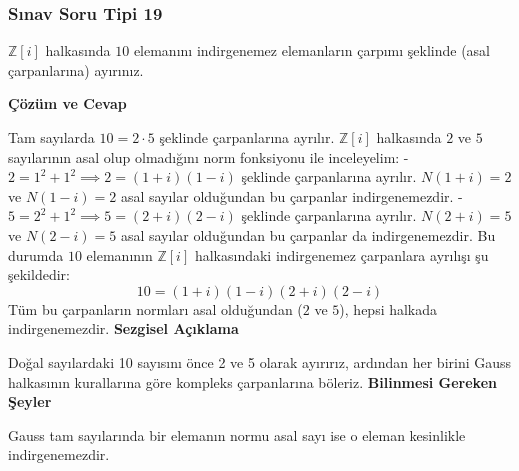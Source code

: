 \documentclass[11pt, a4paper]{article}
\newenvironment{cozum}{
    \vspace{0.5cm}
    \noindent\textcolor{green!60!black}{\faCheckCircle\enspace \textbf{\Large Çözüm ve Cevap}}\par\vspace{0.2cm}
}{}
\newenvironment{sezgisel}{
    \vspace{0.5cm}
    \noindent\textcolor{orange!80!black}{\faLightbulb\enspace \textbf{\Large Sezgisel Açıklama}}\par\vspace{0.2cm}
    \itshape
}{}
\newenvironment{bilgi}{
    \vspace{0.5cm}
    \noindent\textcolor{red!70!black}{\faExclamationTriangle\enspace \textbf{\Large Bilinmesi Gereken Şeyler}}\par\vspace{0.2cm}
}{}
\begin{document}
\subsubsection{Sınav Soru Tipi 19}
\begin{sinavbox}
$\mathbb{Z}[i]$ halkasında $10$ elemanını indirgenemez elemanların çarpımı şeklinde (asal çarpanlarına) ayırınız.
\end{sinavbox}
\begin{cozum}
Tam sayılarda $10 = 2 \cdot 5$ şeklinde çarpanlarına ayrılır. $\mathbb{Z}[i]$ halkasında $2$ ve $5$ sayılarının asal olup olmadığını norm fonksiyonu ile inceleyelim:
- $2 = 1^2+1^2 \implies 2 = (1+i)(1-i)$ şeklinde çarpanlarına ayrılır. 
  $N(1+i) = 2$ ve $N(1-i) = 2$ asal sayılar olduğundan bu çarpanlar indirgenemezdir.
- $5 = 2^2+1^2 \implies 5 = (2+i)(2-i)$ şeklinde çarpanlarına ayrılır.
  $N(2+i) = 5$ ve $N(2-i) = 5$ asal sayılar olduğundan bu çarpanlar da indirgenemezdir.
Bu durumda $10$ elemanının $\mathbb{Z}[i]$ halkasındaki indirgenemez çarpanlara ayrılışı şu şekildedir:
\[ 10 = (1+i)(1-i)(2+i)(2-i) \]
Tüm bu çarpanların normları asal olduğundan ($2$ ve $5$), hepsi halkada indirgenemezdir.
\end{cozum}
\begin{sezgisel}
Doğal sayılardaki 10 sayısını önce 2 ve 5 olarak ayırırız, ardından her birini Gauss halkasının kurallarına göre kompleks çarpanlarına böleriz.
\end{sezgisel}
\begin{bilgi}
Gauss tam sayılarında bir elemanın normu asal sayı ise o eleman kesinlikle indirgenemezdir.
\end{bilgi}

\newpage
\end{document}
